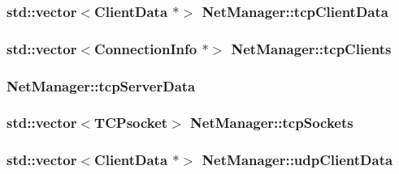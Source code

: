 \hypertarget{classNetManager_a3303746abef87426cab748c92d58006b}{
\subsubsection[{tcp\-Client\-Data}]{\setlength{\rightskip}{0pt plus 5cm}std\-::vector$<${\bf Client\-Data} $\ast$$>$ Net\-Manager\-::tcp\-Client\-Data}}\label{classNetManager_a3303746abef87426cab748c92d58006b}
\hypertarget{classNetManager_abf9491e48d6bc19eacb148d294613b35}{
\subsubsection[{tcp\-Clients}]{\setlength{\rightskip}{0pt plus 5cm}std\-::vector$<${\bf Connection\-Info} $\ast$$>$ Net\-Manager\-::tcp\-Clients\hspace{0.3cm}{\ttfamily [private]}}}\label{classNetManager_abf9491e48d6bc19eacb148d294613b35}
\hypertarget{classNetManager_abca113fc17fe6251fa7ac5a1179ade3c}{
\subsubsection[{tcp\-Server\-Data}]{ Net\-Manager\-::tcp\-Server\-Data}}\label{classNetManager_abca113fc17fe6251fa7ac5a1179ade3c}
\hypertarget{classNetManager_a2314a1df7704bbc4c96d8d0133d78ee6}{
\subsubsection[{tcp\-Sockets}]{\setlength{\rightskip}{0pt plus 5cm}std\-::vector$<$T\-C\-Psocket$>$ Net\-Manager\-::tcp\-Sockets\hspace{0.3cm}{\ttfamily [private]}}}\label{classNetManager_a2314a1df7704bbc4c96d8d0133d78ee6}
\hypertarget{classNetManager_a687d70a4e199c2cbe4cb955a2cd94b04}{
\subsubsection[{udp\-Client\-Data}]{\setlength{\rightskip}{0pt plus 5cm}std\-::vector$<${\bf Client\-Data} $\ast$$>$ Net\-Manager\-::udp\-Client\-Data}}\label{classNetManager_a687d70a4e199c2cbe4cb955a2cd94b04}
